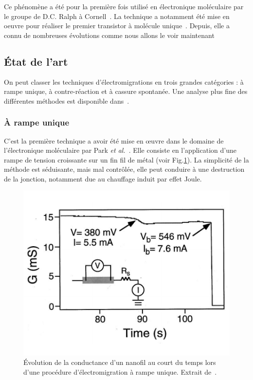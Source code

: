 Ce phénomène a été pour la première fois utilisé en électronique moléculaire par le groupe de D.C. Ralph à Cornell~\cite{Park1999}. La technique a notamment été mise en oeuvre pour réaliser le premier transistor à molécule unique~\cite{Park2000}. Depuis, elle a connu de nombreuses évolutions comme nous allons le voir maintenant

\subsection{État de l'art}
On peut classer les techniques d'électromigrations en trois grandes catégories : à rampe unique, à contre-réaction et à cassure spontanée. Une analyse plus fine des différentes méthodes est disponible dans~\cite{Girod2012}.

\subsubsection{À rampe unique}
C'est la première technique a avoir été mise en œuvre dans le domaine de l'électronique moléculaire par Park \textit{et al.}~\cite{Park1999}. Elle consiste en l'application d'une rampe de tension croissante sur un fin fil de métal (voir Fig.\ref{ParkExemp}). La simplicité de la méthode est séduisante, mais mal contrôlée, elle peut conduire à une destruction de la jonction, notamment due au chauffage induit par effet Joule.

\begin{figure}
\parbox{7cm}{
\includegraphics[scale=0.45]{Fabrication/ElecMigExemp/ParkFig.pdf} 
}
\parbox{6.5cm}{\caption{Évolution de la conductance d'un nanofil au court du temps lors d'une procédure d'électromigration à rampe unique. Extrait de~\cite{Park1999}.}
\label{ParkExemp}
}
\end{figure}



